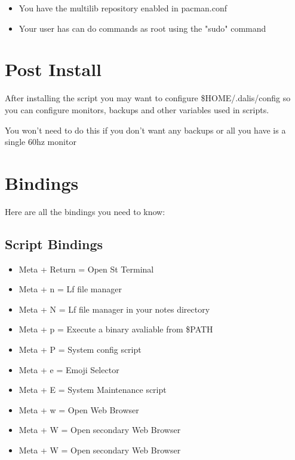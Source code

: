\documentclass[12pt, a4paper]{article}
\begin{document}
\begin{itemize}
    \item You have the multilib repository enabled in pacman.conf
    \item Your user has can do commands as root using the "sudo" command
\end{itemize}

\section{Post Install}

After installing the script you may want to configure \$HOME/.dalis/config so you can
configure monitors, backups and other variables used in scripts.

You won't need to do this if you don't want any backups or all you have is a single 60hz monitor

\newpage

\section{Bindings}
Here are all the bindings you need to know:

\subsection{Script Bindings}

\begin{itemize}
    \item Meta + Return = Open St Terminal
    \item Meta + n      = Lf file manager  
    \item Meta + N      = Lf file manager in your notes directory
    \item Meta + p      = Execute a binary avaliable from \$PATH
    \item Meta + P      = System config script
    \item Meta + e      = Emoji Selector
    \item Meta + E      = System Maintenance script
    \item Meta + w      = Open Web Browser
    \item Meta + W      = Open secondary Web Browser
    \item Meta + W      = Open secondary Web Browser
\end{itemize}
\end{document}
